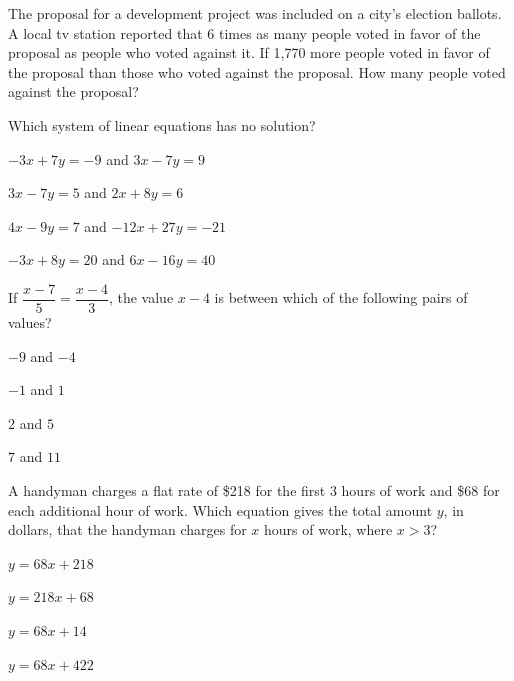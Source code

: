 \vfill
\noindent\begin{minipage}{\linewidth}
\par\smallskip
The proposal for a development project was included on a city's election ballots. A local tv station reported that 6 times as many people voted in favor of the proposal as people who voted against it. If 1,770 more people voted in favor of the proposal than those who voted against the proposal. How many people voted against the proposal?
\end{minipage}
\vfill
\noindent\begin{minipage}{\linewidth}
\par\smallskip
Which system of linear equations has no solution?
\begin{satchoices}
  \item[A)] $-3x+7y=-9$ \quad and \quad $3x-7y=9$
  \item[B)] $3x-7y=5$ \quad and \quad $2x+8y=6$
  \item[C)] $4x-9y=7$ \quad and \quad $-12x+27y=-21$
  \item[D)] $-3x+8y=20$ \quad and \quad $6x-16y=40$
\end{satchoices}
\end{minipage}
\vfill
\clearpage
\noindent\begin{minipage}{\linewidth}
\par\smallskip
If $\dfrac{x-7}{5}=\dfrac{x-4}{3}$, the value $x-4$ is between which of the following pairs of values?
\begin{satchoices}
  \item[A)] $-9$ and $-4$
  \item[B)] $-1$ and $1$
  \item[C)] $2$ and $5$
  \item[D)] $7$ and $11$
\end{satchoices}
\end{minipage}
\vfill
\noindent\begin{minipage}{\linewidth}
\par\smallskip
A handyman charges a flat rate of \$218 for the first 3 hours of work and \$68 for each additional hour of work. Which equation gives the total amount $y$, in dollars, that the handyman charges for $x$ hours of work, where $x>3$?
\begin{satchoices}
  \item[A)] $y=68x+218$
  \item[B)] $y=218x+68$
  \item[C)] $y=68x+14$
  \item[D)] $y=68x+422$
\end{satchoices}
\end{minipage}
